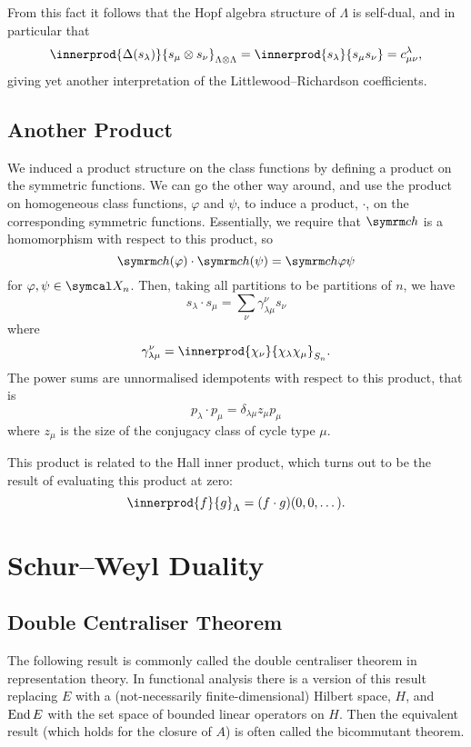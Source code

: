 From this fact it follows that the Hopf algebra structure of \(\Lambda\) is self-dual, and in particular that
\begin{equation}
    \innerprod{\Delta(s_\lambda)}{s_\mu \otimes s_\nu}_{\Lambda \otimes \Lambda} = \innerprod{s_\lambda}{s_\mu s_\nu} = c^\lambda_{\mu\nu},
\end{equation}
giving yet another interpretation of the Littlewood--Richardson coefficients.

\section{Another Product}
We induced a product structure on the class functions by defining a product on the symmetric functions.
We can go the other way around, and use the product on homogeneous class functions, \(\varphi\) and \(\psi\), to induce a product, \(\cdot\), on the corresponding symmetric functions.
Essentially, we require that \(\ch\) is a homomorphism with respect to this product, so
\begin{equation}
    \ch(\varphi) \cdot \ch(\psi) = \ch{\varphi \psi}
\end{equation}
for \(\varphi, \psi \in \classFunctions_n\).
Then, taking all partitions to be partitions of \(n\), we have
\begin{equation}
    s_\lambda \cdot s_\mu = \sum_\nu \gamma^\nu_{\lambda\mu} s_\nu
\end{equation}
where
\begin{equation}
    \gamma^\nu_{\lambda\mu} = \innerprod{\chi_\nu}{\chi_\lambda \chi_\mu}_{S_n}.
\end{equation}
The power sums are unnormalised idempotents with respect to this product, that is
\begin{equation}
    p_\lambda \cdot p_\mu = \delta_{\lambda\mu} z_\mu p_\mu
\end{equation}
where \(z_\mu\) is the size of the conjugacy class of cycle type \(\mu\).

This product is related to the Hall inner product, which turns out to be the result of evaluating this product at zero:
\begin{equation}
    \innerprod{f}{g}_{\Lambda} = (f \cdot g)(0, 0, \dotsc).
\end{equation}

\chapter{Schur--Weyl Duality}
\section{Double Centraliser Theorem}
\begin{remark}{}{}
    The following result is commonly called the double centraliser theorem in representation theory.
    In functional analysis there is a version of this result replacing \(E\) with a (not-necessarily finite-dimensional) Hilbert space, \(H\), and \(\operatorname{End} E\) with the set space of bounded linear operators on \(H\).
    Then the equivalent result (which holds for the closure of \(A\)) is often called the bicommutant theorem.
\end{remark}

